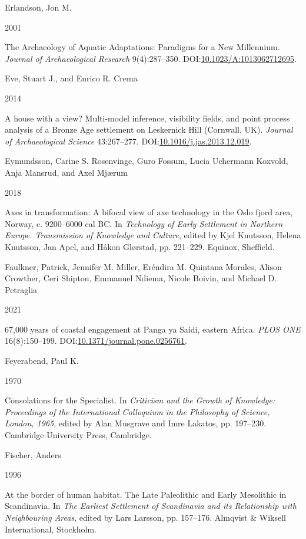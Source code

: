 \documentclass[
  12pt,
  a4paper,
  oneside]{book}
\newlength{\cslhangindent}
\newlength{\csllabelwidth}
\newlength{\cslentryspacingunit} %
\newenvironment{CSLReferences}[2] %
 {%
  \setlength{\parindent}{0pt}
  \ifodd #1
  \let\oldpar\par
  \def\par{\hangindent=\cslhangindent\oldpar}
  \fi
  \setlength{\parskip}{#2\cslentryspacingunit}
 }%
 {}
\newcommand{\CSLBlock}[1]{#1\hfill\break}
\newcommand{\CSLLeftMargin}[1]{\parbox[t]{\csllabelwidth}{#1}}
\newcommand{\CSLRightInline}[1]{\parbox[t]{\linewidth - \csllabelwidth}{#1}\break}
\begin{document}
\begin{CSLReferences}{0}{0}
\leavevmode{}%
\CSLBlock{Erlandson, Jon M.}
\CSLLeftMargin{ 2001}%
\CSLRightInline{{The Archaeology of Aquatic Adaptations: Paradigms for a New Millennium}. \emph{Journal of Archaeological Research} 9(4):287--350. DOI:\href{https://doi.org/10.1023/A:1013062712695}{10.1023/A:1013062712695}.}

\leavevmode{}%
\CSLBlock{Eve, Stuart J., and Enrico R. Crema}
\CSLLeftMargin{ 2014}%
\CSLRightInline{{A house with a view? Multi-model inference, visibility fields, and point process analysis of a Bronze Age settlement on Leskernick Hill (Cornwall, UK)}. \emph{Journal of Archaeological Science} 43:267--277. DOI:\href{https://doi.org/10.1016/j.jas.2013.12.019}{10.1016/j.jas.2013.12.019}.}

\leavevmode{}%
\CSLBlock{Eymundsson, Carine S. Rosenvinge, Guro Fossum, Lucia Uchermann Koxvold, Anja Mansrud, and Axel Mjærum}
\CSLLeftMargin{ 2018}%
\CSLRightInline{{Axes in transformation: A bifocal view of axe technology in the Oslo fjord area, Norway, c. 9200--6000 cal BC}. In \emph{{Technology of Early Settlement in Northern Europe. Transmission of Knowledge and Culture}}, edited by Kjel Knutsson, Helena Knutsson, Jan Apel, and Håkon Glørstad, pp. 221--229. Equinox, Sheffield.}

\leavevmode{}%
\CSLBlock{Faulkner, Patrick, Jennifer M. Miller, Eréndira M. Quintana Morales, Alison Crowther, Ceri Shipton, Emmanuel Ndiema, Nicole Boivin, and Michael D. Petraglia}
\CSLLeftMargin{ 2021}%
\CSLRightInline{67,000 years of coastal engagement at Panga ya Saidi, eastern Africa. \emph{PLOS ONE} 16(8):150--199. DOI:\href{https://doi.org/10.1371/journal.pone.0256761}{10.1371/journal.pone.0256761}.}

\leavevmode{}%
\CSLBlock{Feyerabend, Paul K.}
\CSLLeftMargin{ 1970}%
\CSLRightInline{{Consolations for the Specialist}. In \emph{{Criticism and the Growth of Knowledge: Proceedings of the International Colloquium in the Philosophy of Science, London, 1965}}, edited by Alan Musgrave and Imre Lakatos, pp. 197--230. Cambridge University Press, Cambridge.}

\leavevmode{}%
\CSLBlock{Fischer, Anders}
\CSLLeftMargin{ 1996}%
\CSLRightInline{{At the border of human habitat. The Late Paleolithic and Early Mesolithic in Scandinavia}. In \emph{{The Earliest Settlement of Scandinavia and its Relationship with Neighbouring Areas}}, edited by Lars Larsson, pp. 157--176. Almqvist \& Wiksell International, Stockholm.}


\end{CSLReferences}
\end{document}

